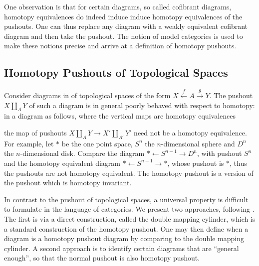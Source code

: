 \documentclass{scrartcl}
\theoremstyle{plain}
\theoremstyle{definition}
\newcommand{\from}{\leftarrow}
\let\xto\xrightarrow
\let\xfrom\xleftarrow
\renewcommand{\coprod}{\mathbin{\amalg}}
\begin{document}
One observation is that for certain diagrams, so called cofibrant diagrams, homotopy equivalences do indeed induce induce homotopy equivalences of the pushouts. One can thus replace any diagram with a weakly equivalent cofibrant diagram and then take the pushout. The notion of model categories is used to make these notions precise and arrive at a definition of homotopy pushouts. 

\subsection{Homotopy Pushouts of Topological Spaces}\label{subsec:homotopy-pushouts-spaces}


Consider diagrams in of topological spaces of the form $X \xfrom{f} A \xto{g} Y$. The pushout $X\coprod_A Y$ of such a diagram is in general poorly behaved with respect to homotopy: in a diagram as follows, where the vertical maps are homotopy equivalences

\begin{center}
\end{center}
the map of pushouts $X\coprod_A Y \to X'\coprod_{A'} Y'$ need not be a homotopy equivalence. For example, let $*$ be the one point space, $S^n$ the $n$-dimensional sphere and $D^n$ the $n$-dimensional disk. Compare the diagram $*\from S^{n-1}\to D^n$, with pushout $S^n$ and the homotopy equivalent diagram $*\from S^{n-1}\to *$, whose pushout is $*$, thus the pushouts are not homotopy equivalent. The homotopy pushout is a version of the pushout which is homotopy invariant. 

In contrast to the pushout of topological spaces, a universal property is difficult to formulate in the language of categories. We present two approaches, following \cite[1.2]{may2011more}. The first is via a direct construction, called the double mapping cylinder, which is a standard construction of the homotopy pushout. One may then define when a diagram is a homotopy pushout diagram by comparing to the double mapping cylinder. A second approach is to identify certain diagrams that are ``general enough'', so that the normal pushout is also homotopy pushout. 
\end{document}

